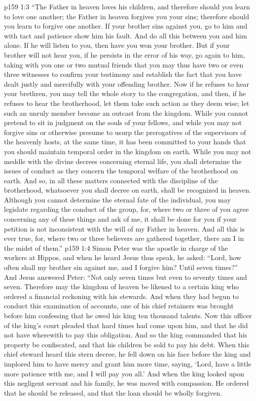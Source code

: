 \vs p159 1:3 \textcolor{ubdarkred}{“The Father in heaven loves his children, and therefore should you learn to love one another; the Father in heaven forgives you your sins; therefore should you learn to forgive one another. If your brother sins against you, go to him and with tact and patience show him his fault. And do all this between you and him alone. If he will listen to you, then have you won your brother. But if your brother will not hear you, if he persists in the error of his way, go again to him, taking with you one or two mutual friends that you may thus have two or even three witnesses to confirm your testimony and establish the fact that you have dealt justly and mercifully with your offending brother. Now if he refuses to hear your brethren, you may tell the whole story to the congregation, and then, if he refuses to hear the brotherhood, let them take such action as they deem wise; let such an unruly member become an outcast from the kingdom. While you cannot pretend to sit in judgment on the souls of your fellows, and while you may not forgive sins or otherwise presume to usurp the prerogatives of the supervisors of the heavenly hosts, at the same time, it has been committed to your hands that you should maintain temporal order in the kingdom on earth. While you may not meddle with the divine decrees concerning eternal life, you shall determine the issues of conduct as they concern the temporal welfare of the brotherhood on earth. And so, in all these matters connected with the discipline of the brotherhood, whatsoever you shall decree on earth, shall be recognized in heaven. Although you cannot determine the eternal fate of the individual, you may legislate regarding the conduct of the group, for, where two or three of you agree concerning any of these things and ask of me, it shall be done for you if your petition is not inconsistent with the will of my Father in heaven. And all this is ever true, for, where two or three believers are gathered together, there am I in the midst of them.”}
\vs p159 1:4 \pc Simon Peter was the apostle in charge of the workers at Hippos, and when he heard Jesus thus speak, he asked: “Lord, how often shall my brother sin against me, and I forgive him? Until seven times?” And Jesus answered Peter: \textcolor{ubdarkred}{“Not only seven times but even to seventy times and seven. Therefore may the kingdom of heaven be likened to a certain king who ordered a financial reckoning with his stewards. And when they had begun to conduct this examination of accounts, one of his chief retainers was brought before him confessing that he owed his king ten thousand talents. Now this officer of the king’s court pleaded that hard times had come upon him, and that he did not have wherewith to pay this obligation. And so the king commanded that his property be confiscated, and that his children be sold to pay his debt. When this chief steward heard this stern decree, he fell down on his face before the king and implored him to have mercy and grant him more time, saying, ‘Lord, have a little more patience with me, and I will pay you all.’ And when the king looked upon this negligent servant and his family, he was moved with compassion. He ordered that he should be released, and that the loan should be wholly forgiven.}
